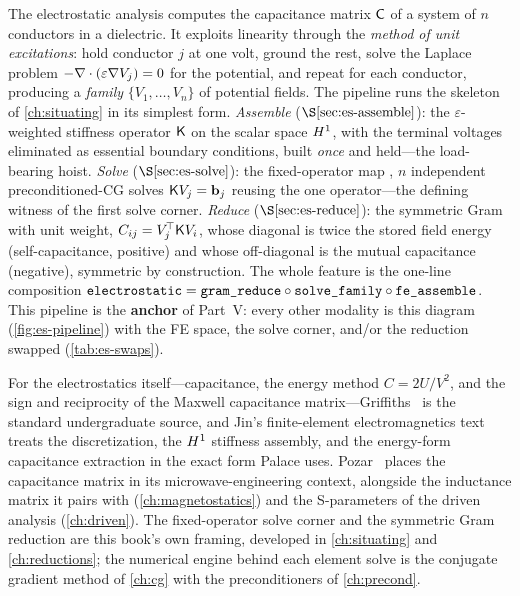 \summarysection
The electrostatic analysis computes the capacitance matrix $\mathsf{C}$ of a system of
$n$ conductors in a dielectric. It exploits linearity through the \emph{method of
unit excitations}: hold conductor $j$ at one volt, ground the rest, solve the Laplace
problem $-\nabla\cdot(\varepsilon\nabla V_j)=0$ for the potential, and repeat for each
conductor, producing a \emph{family} $\{V_1,\dots,V_n\}$ of potential fields. The
pipeline runs the skeleton of \cref{ch:situating} in its simplest form. \emph{Assemble}
($\S\ref{sec:es-assemble}$): the $\varepsilon$-weighted stiffness operator $\mathsf{K}$ on
the scalar space $H^1$, with the terminal voltages eliminated as essential boundary
conditions, built \emph{once} and held---the load-bearing hoist. \emph{Solve}
($\S\ref{sec:es-solve}$): the fixed-operator map , $n$ independent
preconditioned-CG solves $\mathsf{K} V_j=\mathbf{b}_j$ reusing the one operator---the defining
witness of the first solve corner. \emph{Reduce} ($\S\ref{sec:es-reduce}$): the
symmetric Gram  with unit weight, $C_{ij}=V_j^{\!\top}\mathsf{K} V_i$,
whose diagonal is twice the stored field energy (self-capacitance, positive) and whose
off-diagonal is the mutual capacitance (negative), symmetric by construction. The whole
feature is the one-line composition
$\texttt{electrostatic}=\texttt{gram\_reduce}\circ\texttt{solve\_family}\circ
\texttt{fe\_assemble}$. This pipeline is the \textbf{anchor} of Part~V: every other
modality is this diagram (\cref{fig:es-pipeline}) with the FE space, the solve corner,
and/or the reduction swapped (\cref{tab:es-swaps}).

\furtherreading
For the electrostatics itself---capacitance, the energy method $C=2U/V^2$, and the
sign and reciprocity of the Maxwell capacitance matrix---Griffiths~\citep{griffiths2017}
is the standard undergraduate source, and Jin's finite-element electromagnetics
text~\citep{jin2014} treats the discretization, the $H^1$ stiffness assembly, and the
energy-form capacitance extraction in the exact form Palace uses. Pozar~\citep{pozar2011}
places the capacitance matrix in its microwave-engineering context, alongside the
inductance matrix it pairs with (\cref{ch:magnetostatics}) and the S-parameters of the
driven analysis (\cref{ch:driven}). The fixed-operator solve corner and the symmetric
Gram reduction are this book's own framing, developed in \cref{ch:situating} and
\cref{ch:reductions}; the numerical engine behind each element solve is the conjugate
gradient method of \cref{ch:cg} with the preconditioners of \cref{ch:precond}.

